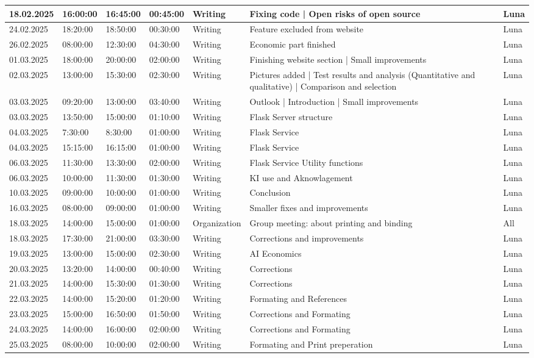 \begin{longtable}{@{}p{1.3cm} p{1cm} p{1cm} p{1cm} p{1.5cm} p{4.5cm} p{1.2cm}@{}}
\hline
18.02.2025 & 16:00:00 & 16:45:00 & 00:45:00 & Writing & Fixing code | Open risks of open source & Luna \\
\hline
24.02.2025 & 18:20:00 & 18:50:00 & 00:30:00 & Writing & Feature excluded from website & Luna \\
\hline
26.02.2025 & 08:00:00 & 12:30:00 & 04:30:00 & Writing & Economic part finished & Luna \\
\hline
01.03.2025 & 18:00:00 & 20:00:00 & 02:00:00 & Writing & Finishing website section | Small improvements & Luna \\
\hline
02.03.2025 & 13:00:00 & 15:30:00 & 02:30:00 & Writing & Pictures added | Test results and analysis (Quantitative and qualitative) | Comparison and selection & Luna \\
\hline
03.03.2025 & 09:20:00 & 13:00:00 & 03:40:00 & Writing & Outlook | Introduction | Small improvements & Luna \\
\hline
03.03.2025 & 13:50:00 & 15:00:00 & 01:10:00 & Writing & Flask Server structure & Luna \\
\hline
04.03.2025 & 7:30:00 & 8:30:00 & 01:00:00 & Writing & Flask Service & Luna \\
\hline
04.03.2025 & 15:15:00 & 16:15:00 & 01:00:00 & Writing & Flask Service & Luna \\
\hline
06.03.2025 & 11:30:00 & 13:30:00 & 02:00:00 & Writing & Flask Service Utility functions & Luna \\
\hline
06.03.2025 & 10:00:00 & 11:30:00 & 01:30:00 & Writing & KI use and Aknowlagement & Luna \\
\hline
10.03.2025 & 09:00:00 & 10:00:00 & 01:00:00 & Writing & Conclusion & Luna \\
\hline
16.03.2025 & 08:00:00 & 09:00:00 & 01:00:00 & Writing & Smaller fixes and improvements & Luna \\
\hline
18.03.2025 & 14:00:00 & 15:00:00 & 01:00:00 & Organization & Group meeting: about printing and binding & All \\
\hline
18.03.2025 & 17:30:00 & 21:00:00 & 03:30:00 & Writing & Corrections and improvements & Luna \\
\hline
19.03.2025 & 13:00:00 & 15:00:00 & 02:30:00 & Writing & AI Economics & Luna \\
\hline
20.03.2025 & 13:20:00 & 14:00:00 & 00:40:00 & Writing & Corrections & Luna \\
\hline
21.03.2025 & 14:00:00 & 15:30:00 & 01:30:00 & Writing & Corrections & Luna \\
\hline
22.03.2025 & 14:00:00 & 15:20:00 & 01:20:00 & Writing & Formating and References & Luna \\
\hline
23.03.2025 & 15:00:00 & 16:50:00 & 01:50:00 & Writing & Corrections and Formating & Luna \\
\hline
24.03.2025 & 14:00:00 & 16:00:00 & 02:00:00 & Writing & Corrections and Formating & Luna \\
\hline
25.03.2025 & 08:00:00 & 10:00:00 & 02:00:00 & Writing & Formating and Print preperation & Luna \\


\end{longtable}
